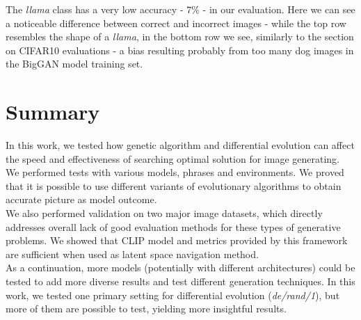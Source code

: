 \documentclass[11pt,a4paper,openany]{book}
\begin{document}
\newline
\noindent The \textit{llama} class has a very low accuracy - $7\%$ - in our evaluation. Here we can see a noticeable difference between correct and incorrect images - while the top row resembles the shape of a \textit{llama}, in the bottom row we see, similarly to the section on CIFAR10 evaluations - a bias resulting probably from too many dog images in the BigGAN model training set.

\chapter{Summary}

\noindent In this work, we tested how genetic algorithm and differential evolution can affect the speed and effectiveness of searching optimal solution for image generating. We performed tests with various models, phrases and environments. We proved that it is possible to use different variants of evolutionary algorithms to obtain accurate picture as model outcome.\\
\noindent We also performed validation on two major image datasets, which directly addresses overall lack of good evaluation methods for these types of generative problems.  We showed that CLIP model and metrics provided by this framework are sufficient when used as latent space navigation method.\\
\noindent As a continuation, more models (potentially with different architectures) could be tested to add more diverse results and test different generation techniques.  In this work, we tested one primary setting for differential evolution (\textit{de/rand/1}), but more of them are possible to test, yielding more insightful results.
\end{document}
